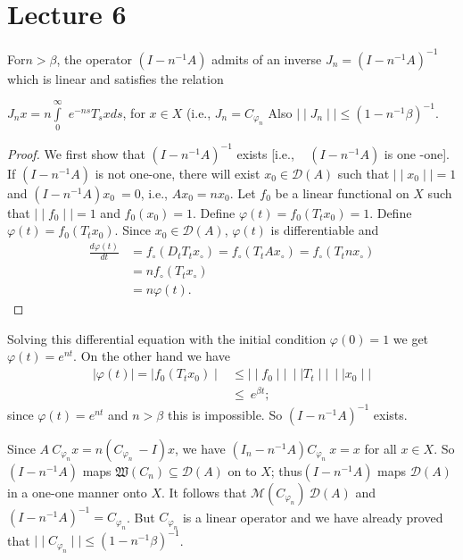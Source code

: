 \chapter{Lecture 6}\label{chap6}

\begin{theorem*}
 For\pageoriginale $ n > \beta $, the operator $ (I - n^{-1} A) $ admits of an
 inverse $ J_n = ( I -n^{-1} A )^{-1} $ which is linear and
 satisfies the relation 

 $ J_n x = n \int\limits^{\infty}_{0} $ $ e^{-ns} T_s x ds $, for $ x
 \in X $ (i.e., $J_n = C_{\varphi_{n}} $ Also $ \mid\mid J_n
 \mid\mid \leq ( 1-n^{-1} \beta )^{-1} $. 
\end{theorem*}

\begin{proof}
 We first show that $ (I -n^{-1} A )^{-1} $ exists [i.e., ~
  $( I - n^{-1} A)$ is one -one]. If $ (I - n^{-1} A) $ is
 not one-one, there will exist $ x_0 \in \mathscr{D} (A) $ such that
 $ \mid\mid x_0 \mid\mid = 1$ and $(I - n^{-1} A) x_0 ~ = 0 $, i.e.,
 $Ax_0=n x_0$. Let $ f_0 $ be a linear functional on $X$ such that $
 \mid\mid f_0 \mid\mid = 1 $ and $ f_0 (x_0) = 1 $. Define $ \varphi
 (t) = f_0 ( T_t x_0 )=1 $. Define $ \varphi (t) = f_0 (T_t x_0 )
 $. Since $x_0 \in \mathscr{D} (A) $, $ \varphi (t) $ is
 differentiable and 
 \begin{align*}
  \frac{d \varphi (t)}{dt} &= f_\circ ( D_t T_t x_\circ ) = f_\circ
  (T_t A x_\circ) = f_\circ (T_t n x_\circ) \\ 
  &= n f_\circ ( T_t x_\circ ) \\
  &= n \varphi (t).
 \end{align*}
\end{proof}

Solving this differential equation with the initial condition $
\varphi (0) = 1 $ we get $ \varphi (t) = e^{nt} $. On the other hand
we have 
\begin{align*}
 \mid \varphi (t) \mid = \mid f_0 ( T_t x_0 ) \mid &\leq \mid\mid
 f_0 \mid\mid ~ \mid\mid T_t \mid\mid ~ \mid\mid x_0 \mid\mid \\ 
 &\leq~e^{\beta t};
\end{align*}
since $ \varphi (t) = e^{nt} $ and $ n > \beta $ this is
impossible. So $ ( I - n^{-1} A )^{-1} $ exists. 

Since $ A ~ C_{\varphi_{n}} x = n ( C_{\varphi_{n}} ~ - I )x $, we
have $(I_n- n^{-1}A) C_{\varphi_{n}} ~ x = x $ for all $ x \in X $. So
$ ( I - n^{-1} A )$ maps $\mathfrak{W} (C_n) \subseteq \mathscr{D} (A) $
on to $X$; thus\pageoriginale $ (I - n^{-1} A ) $ maps $ \mathscr{D} (A) $ in a
one-one manner onto $X$. It follows that $ \mathscr{M} (
C_{\varphi_{n}} )~ \mathscr{D} (A)$ and $(I - n^{-1} A)^{-1} =
C_{\varphi_{n}}$. But $C_{\varphi_{n}}$ is a linear operator and we
have already proved that $ \mid\mid C_{\varphi_{n}} \mid\mid \leq (
1-n^{-1} \beta )^{-1} $. 

